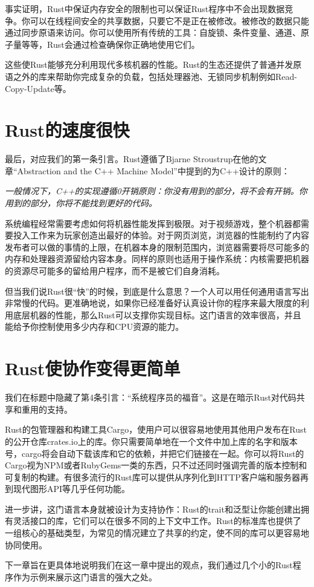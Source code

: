 事实证明，Rust中保证内存安全的限制也可以保证Rust程序中不会出现数据竞争。你可以在线程间安全的共享数据，只要它不是正在被修改。被修改的数据只能通过同步原语来访问。你可以使用所有传统的工具：自旋锁、条件变量、通道、原子量等等，Rust会通过检查确保你正确地使用它们。

这些使Rust能够充分利用现代多核机器的性能。Rust的生态还提供了普通并发原语之外的库来帮助你完成复杂的负载，包括处理器池、无锁同步机制例如Read-Copy-Update等。

\section{Rust的速度很快}
最后，对应我们的第一条引言。Rust遵循了Bjarne Stroustrup在他的文章“Abstraction and the C++ Machine Model”中提到的为C++设计的原则：

\emph{一般情况下，C++的实现遵循0开销原则：你没有用到的部分，将不会有开销。你用到的部分，你将不能找到更好的代码。}

系统编程经常需要考虑如何将机器性能发挥到极限。对于视频游戏，整个机器都需要投入工作来为玩家创造出最好的体验。对于网页浏览，浏览器的性能制约了内容发布者可以做的事情的上限，在机器本身的限制范围内，浏览器需要将尽可能多的内存和处理器资源留给内容本身。同样的原则也适用于操作系统：内核需要把机器的资源尽可能多的留给用户程序，而不是被它们自身消耗。

但当我们说Rust很“快”的时候，到底是什么意思？一个人可以用任何通用语言写出非常慢的代码。更准确地说，如果你已经准备好认真设计你的程序来最大限度的利用底层机器的性能，那么Rust可以支撑你实现目标。这门语言的效率很高，并且能给予你控制使用多少内存和CPU资源的能力。

\section{Rust使协作变得更简单}
我们在标题中隐藏了第4条引言：“系统程序员的福音”。这是在暗示Rust对代码共享和重用的支持。

Rust的包管理器和构建工具Cargo，使用户可以很容易地使用其他用户发布在Rust的公开仓库crates.io上的库。你只需要简单地在一个文件中加上库的名字和版本号，cargo将会自动下载该库和它的依赖，并把它们链接在一起。你可以将Rust的Cargo视为NPM或者RubyGems一类的东西，只不过还同时强调完善的版本控制和可复制的构建。有很多流行的Rust库可以提供从序列化到HTTP客户端和服务器再到现代图形API等几乎任何功能。

进一步讲，这门语言本身就被设计为支持协作：Rust的trait和泛型让你能创建出拥有灵活接口的库，它们可以在很多不同的上下文中工作。Rust的标准库也提供了一组核心的基础类型，为常见的情况建立了共享的约定，使不同的库可以更容易地协同使用。

下一章旨在更具体地说明我们在这一章中提出的观点，我们通过几个小的Rust程序作为示例来展示这门语言的强大之处。